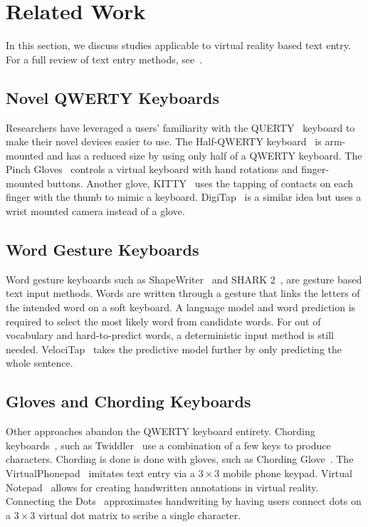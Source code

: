 \section{Related Work}

In this section, we discuss studies applicable to virtual reality based text entry.
For a full review of text entry methods, see~\cite{mackenzie2002text, zhai2005search, Buxton2011}.

\subsection{Novel QWERTY Keyboards}
Researchers have leveraged a users' familiarity with the QUERTY~\cite{noyes1983qwerty} keyboard to make their novel devices easier to use.
The Half-QWERTY keyboard~\cite{matias1993half} is arm-mounted and has a reduced size by using only half of a QWERTY keyboard.
The Pinch Gloves~\cite{bowman2002text} controls a virtual keyboard with hand rotations and finger-mounted buttons.
Another glove, KITTY~\cite{Kuester:2005:TKI:1101616.1101635} uses the tapping of contacts on each finger with the thumb to mimic a keyboard.
DigiTap~\cite{Pratorius:2014:DEV:2671015.2671029} is a similar idea but uses a wrist mounted camera instead of a glove.

\subsection{Word Gesture Keyboards}
Word gesture keyboards such as ShapeWriter~\cite{zhai2012word,Zhai:2009:SIL:1520340.1520380} and SHARK 2~\cite{kristensson2004shark}, are gesture based text input methods.
Words are written through a gesture that links the letters of the intended word on a soft keyboard. A language model and word prediction is required to select the most likely word from  candidate words.
For out of vocabulary and hard-to-predict words, a deterministic input method is still needed.
VelociTap~\cite{vertanen2015velocitap} takes the predictive model further by only predicting the whole sentence.

\subsection{Gloves and Chording Keyboards}
Other approaches abandon the QWERTY keyboard entirety.
Chording keyboards~\cite{noyes1983chord}, such as Twiddler~\cite{lyons2004twiddler} use a combination of a few keys to produce characters.
Chording is done is done with gloves, such as Chording Glove~\cite{rosenberg1999chording}.
The VirtualPhonepad~\cite{ahn2006virtualphonepad} imitates text entry via a $3\times3$ mobile phone keypad.
Virtual Notepad~\cite{poupyrev1998virtual} allows for creating handwritten annotations in virtual reality.
Connecting the Dots~\cite{frees2006connecting} approximates handwriting by having users connect dots on a $3\times3$ virtual dot matrix to scribe a single character.

